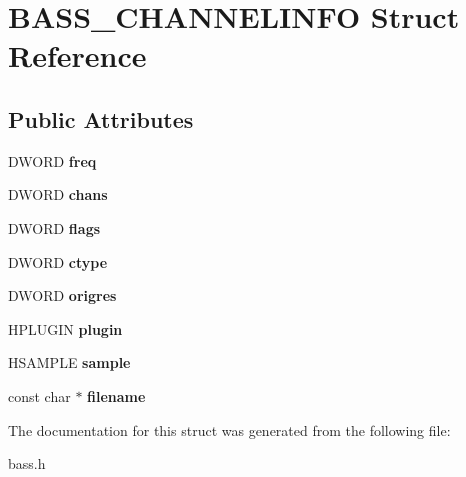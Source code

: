 \hypertarget{structBASS__CHANNELINFO}{}\section{B\+A\+S\+S\+\_\+\+C\+H\+A\+N\+N\+E\+L\+I\+N\+F\+O Struct Reference}
\label{structBASS__CHANNELINFO}
\subsection*{Public Attributes}
\begin{DoxyCompactItemize}
\item 
\hypertarget{structBASS__CHANNELINFO_ad1b77f57519254df9076321422ae8088}{}D\+W\+O\+R\+D {\bfseries freq}\label{structBASS__CHANNELINFO_ad1b77f57519254df9076321422ae8088}

\item 
\hypertarget{structBASS__CHANNELINFO_a6ffe1288a34a2379fe29182ccacd4851}{}D\+W\+O\+R\+D {\bfseries chans}\label{structBASS__CHANNELINFO_a6ffe1288a34a2379fe29182ccacd4851}

\item 
\hypertarget{structBASS__CHANNELINFO_a8af64f94d3e478251a26927f2a4cc181}{}D\+W\+O\+R\+D {\bfseries flags}\label{structBASS__CHANNELINFO_a8af64f94d3e478251a26927f2a4cc181}

\item 
\hypertarget{structBASS__CHANNELINFO_a8485903de8da5ea87f18af4fead8b109}{}D\+W\+O\+R\+D {\bfseries ctype}\label{structBASS__CHANNELINFO_a8485903de8da5ea87f18af4fead8b109}

\item 
\hypertarget{structBASS__CHANNELINFO_a65dafe34621563b319749edff82d824c}{}D\+W\+O\+R\+D {\bfseries origres}\label{structBASS__CHANNELINFO_a65dafe34621563b319749edff82d824c}

\item 
\hypertarget{structBASS__CHANNELINFO_a13d3801ae12e966bf36bdf7cf147fd40}{}H\+P\+L\+U\+G\+I\+N {\bfseries plugin}\label{structBASS__CHANNELINFO_a13d3801ae12e966bf36bdf7cf147fd40}

\item 
\hypertarget{structBASS__CHANNELINFO_ae2314c04cfb2a04031df1a34d9eb898e}{}H\+S\+A\+M\+P\+L\+E {\bfseries sample}\label{structBASS__CHANNELINFO_ae2314c04cfb2a04031df1a34d9eb898e}

\item 
\hypertarget{structBASS__CHANNELINFO_acf60ef395b6c5432b617d092ad1c3ce1}{}const char $\ast$ {\bfseries filename}\label{structBASS__CHANNELINFO_acf60ef395b6c5432b617d092ad1c3ce1}

\end{DoxyCompactItemize}


The documentation for this struct was generated from the following file\+:\begin{DoxyCompactItemize}
\item 
bass.\+h\end{DoxyCompactItemize}
